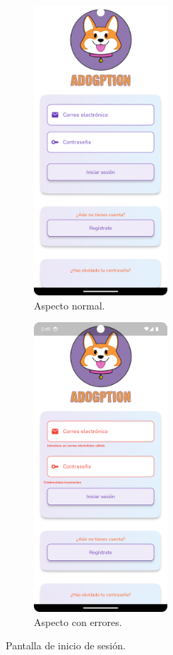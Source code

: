 \documentclass[a4paper, 12pt]{article}
\begin{document}
\begin{figure}[H]
   	\begin{subfigure}{0.48\textwidth}
		\begin{center}
			{\includegraphics[width=5cm]{app/Login.png}\par}
			\caption{Aspecto normal.}
		\end{center}  
	\end{subfigure}\hfill
   	\begin{subfigure}{0.48\textwidth}
		\begin{center}
			{\includegraphics[width=5cm]{app/LoginWithErrors.png}\par}
			\caption{Aspecto con errores.}
		\end{center}  
	\end{subfigure}\hfill
	\caption{Pantalla de inicio de sesión.}\label{fig:login}
\end{figure}
\end{document}
